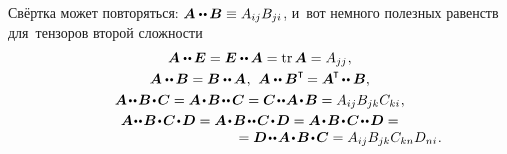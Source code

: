 \begin{otherlanguage}{russian}
Свёртка может повторяться: ${\bm{A} \dotdotp \hspace{-0.1ex} \bm{B} \equiv A_{ij} B_{ji}}$, и~вот немного полезных равенств для~тензоров второй сложности
\begin{equation}
\begin{array}{cr}
\bm{A} \dotdotp \hspace{-0.1ex} \bm{E} = \bm{E} \dotdotp \hspace{-0.1ex} \bm{A} = \operatorname{tr} \bm{A} = A_{jj} \hspace{0.1ex},\\[0.7ex]
%
\bm{A} \dotdotp \hspace{-0.1ex} \bm{B} = \bm{B} \dotdotp \hspace{-0.1ex} \bm{A} \hspace{0.1ex}, \:\,
\bm{A} \dotdotp \bm{B}^{\T} \hspace{-0.2ex} = \bm{A}^{\hspace{-0.16ex}\T} \hspace{-0.2ex} \dotdotp \bm{B} ,
\\[0.7ex]
%
\bm{A} \narrowdotdotp \bm{B} \narrowdotp \bm{C} = \bm{A} \narrowdotp \bm{B} \narrowdotdotp \hspace{0.1ex} \bm{C} = \bm{C} \narrowdotdotp \hspace{-0.1ex} \bm{A} \narrowdotp \bm{B} = A_{ij} B_{jk} C_{ki} \hspace{0.1ex},\\[0.6ex]
%
\bm{A} \hspace{-0.1ex}\narrowdotdotp \bm{B} \narrowdotp \bm{C} \narrowdotp \bm{D} = \bm{A} \narrowdotp \bm{B} \narrowdotdotp \bm{C} \narrowdotp \bm{D} = \bm{A} \narrowdotp \bm{B} \narrowdotp \bm{C} \narrowdotdotp \bm{D} = \\
\hspace{11.5em} = \bm{D} \narrowdotdotp \bm{A} \narrowdotp \bm{B} \narrowdotp \bm{C} = A_{ij} B_{jk} C_{kn} D_{ni} \hspace{0.1ex}.
\end{array}
\end{equation}

\end{otherlanguage}

\label{para:polyadicrepresentation}

